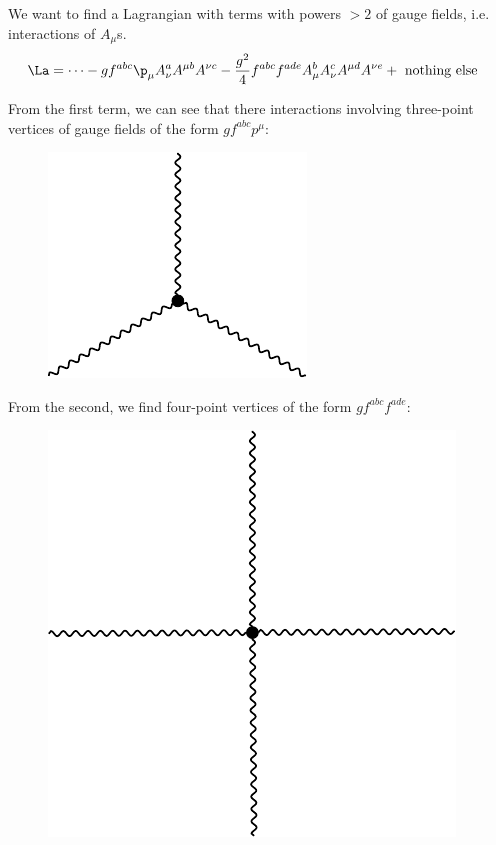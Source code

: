 \documentclass[relqm.tex]{subfiles}
\begin{document}
\chapter{}
We want to find a Lagrangian with terms with powers $>2$ of gauge fields, i.e. interactions of $A_\mu$s.
\begin{align}
    \La &= \dots - gf^{abc}\p_\mu A_\nu^aA^{\mu b}A^{\nu c} - \frac{g^2}{4}f^{abc}f^{ade}A_\mu^b A_\nu^c A^{\mu d}A^{\nu e} + \text{ nothing else}
\end{align}
\begin{multicols}{2}
From the first term, we can see that there interactions involving three-point vertices of gauge fields of the form $gf^{abc}p^\mu$:
\begin{figure}[H]
    \centering
    \includegraphics[scale=0.6]{diagrams/threepoint.pdf}
\end{figure}
\columnbreak
From the second, we find four-point vertices of the form $gf^{abc}f^{ade}$:
\begin{figure}[H]
    \centering
    \includegraphics[scale=0.4]{diagrams/fourpoint.pdf}
\end{figure}
\end{multicols}
\end{document}
